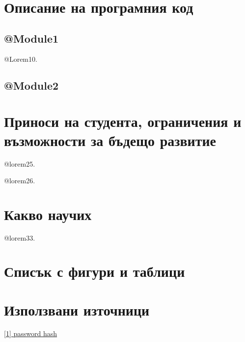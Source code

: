 \documentclass[12pt]{article}
\begin{document}
 
\section{Описание на програмния код}

\subsection{@Module1}
 @Lorem10.

\subsection{@Module2}

\medskip


\section{Приноси на студента, ограничения и възможности за бъдещо развитие}

@lorem25.

\medskip

\noindent @lorem26.

\section{Какво научих}
@lorem33.

\section{Списък с фигури и таблици}

\listoftables

\listoffigures

\section{Използвани източници}

\noindent\href{http://php.net/manual/en/function.password-hash.php}{[1] password hash}
 
\medskip



\bigskip
\end{document}
